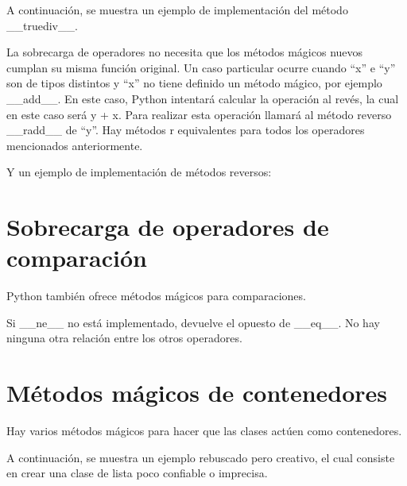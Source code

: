 \documentclass{report}
\newcommand{\doble}[1]{``#1''}
\begin{document}

A continuación, se muestra un ejemplo de implementación del método \_\_truediv\_\_.


La sobrecarga de operadores no necesita que los métodos mágicos nuevos cumplan su misma función original.
Un caso particular ocurre cuando \doble{x} e \doble{y} son de tipos distintos y \doble{x} no tiene definido un método mágico, por ejemplo \_\_add\_\_. En este caso, Python intentará calcular la operación al revés, la cual en este caso será y + x. Para realizar esta operación llamará al método reverso \_\_radd\_\_ de “y”.
Hay métodos r equivalentes para todos los operadores mencionados anteriormente.


Y un ejemplo de implementación de métodos reversos:


\section{Sobrecarga de operadores de comparación}

Python también ofrece métodos mágicos para comparaciones.


Si \_\_ne\_\_ no está implementado, devuelve el opuesto de \_\_eq\_\_. No hay ninguna otra relación entre los otros operadores.


\section{Métodos mágicos de contenedores}

Hay varios métodos mágicos para hacer que las clases actúen como contenedores.


A continuación, se muestra un ejemplo rebuscado pero creativo, el cual consiste en crear una clase de lista poco confiable o imprecisa.


\end{document}
